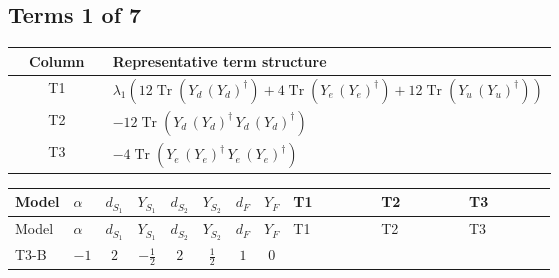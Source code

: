 \documentclass[8pt]{article}
\begin{document}
\begin{landscape}
\subsection*{Terms 1 of 7}
\begin{center}
\begin{tabular}{@{}c >{\raggedright\arraybackslash}p{0.82\linewidth}@{}}
\toprule
Column & Representative term structure \\
\midrule
T1 & \(\displaystyle {\lambda_1} (12 \operatorname{Tr}\!\left({Y_d}\,\left({Y_d}\right)^{\dagger}\right)+4 \operatorname{Tr}\!\left({Y_e}\,\left({Y_e}\right)^{\dagger}\right)+12 \operatorname{Tr}\!\left({Y_u}\,\left({Y_u}\right)^{\dagger}\right))\) \\
\midrule
T2 & \(\displaystyle -12 \operatorname{Tr}\!\left({Y_d}\,\left({Y_d}\right)^{\dagger}\,{Y_d}\,\left({Y_d}\right)^{\dagger}\right)\) \\
\midrule
T3 & \(\displaystyle -4 \operatorname{Tr}\!\left({Y_e}\,\left({Y_e}\right)^{\dagger}\,{Y_e}\,\left({Y_e}\right)^{\dagger}\right)\) \\
\midrule
\bottomrule
\end{tabular}
\end{center}
\smallskip
\tiny
\begin{longtable}{@{}llcccccc >{\raggedright\arraybackslash}p{0.21\linewidth} >{\raggedright\arraybackslash}p{0.21\linewidth} >{\raggedright\arraybackslash}p{0.21\linewidth}@{}}
\toprule
Model & $\alpha$ & $d_{S_1}$ & $Y_{S_1}$ & $d_{S_2}$ & $Y_{S_2}$ & $d_F$ & $Y_F$ & T1 & T2 & T3 \\
\midrule
\endfirsthead
\toprule
Model & $\alpha$ & $d_{S_1}$ & $Y_{S_1}$ & $d_{S_2}$ & $Y_{S_2}$ & $d_F$ & $Y_F$ & T1 & T2 & T3 \\
\midrule
\endhead
T3-B & $-1$ & $2$ & $-\frac{1}{2}$ & $2$ & $\frac{1}{2}$ & $1$ & $0$ & \scriptsize\adjustbox{max width=\linewidth}{$\begin{gathered} {\lambda_1} (12 \operatorname{Tr}\!\left({Y_d}\,\left({Y_d}\right)^{\dagger}\right)+4 \operatorname{Tr}\!\left({Y_e}\,\left({Y_e}\right)^{\dagger}\right)+12 \operatorname{Tr}\!\left({Y_u}\,\left({Y_u}\right)^{\dagger}\right))\end{gathered}$} & \scriptsize\adjustbox{max width=\linewidth}{$\begin{gathered} -12 \operatorname{Tr}\!\left({Y_d}\,\left({Y_d}\right)^{\dagger}\,{Y_d}\,\left({Y_d}\right)^{\dagger}\right)\end{gathered}$} & \scriptsize\adjustbox{max width=\linewidth}{$\begin{gathered} -4 \operatorname{Tr}\!\left({Y_e}\,\left({Y_e}\right)^{\dagger}\,{Y_e}\,\left({Y_e}\right)^{\dagger}\right)\end{gathered}$} \\

\end{longtable}
\end{landscape}
\end{document}
